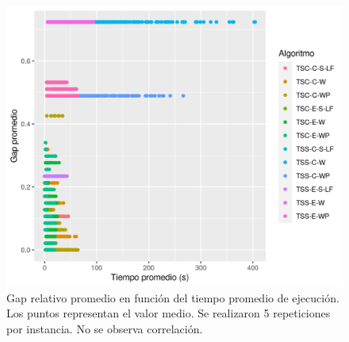 \begin{figure}[H]
    \centering
    \includegraphics[scale = 0.7]{plots/suplementarias/gap_tiempo.png}
    \caption{Gap relativo promedio en función del tiempo promedio de ejecución. Los puntos representan el valor medio. Se realizaron 5 repeticiones por instancia. No se observa correlación.}
    \label{plot:correlacion gap tiempo}
\end{figure}